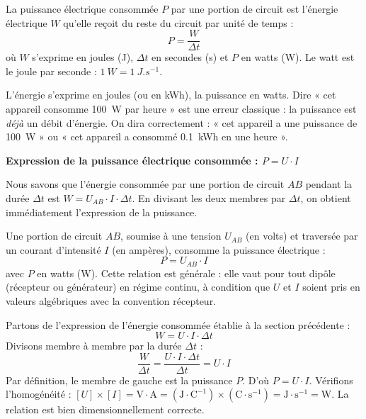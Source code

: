 \documentclass[11pt]{article}
\newcommand{\cle}[1]{{\popxbold\color{popdark}#1}}
\begin{document}
\begin{definition}
La \cle{puissance électrique consommée} $P$ par une portion de circuit est l'énergie électrique $W$ qu'elle reçoit du reste du circuit par unité de temps :
\[ P = \frac{W}{\Delta t} \]
où $W$ s'exprime en joules (J), $\Delta t$ en secondes (s) et $P$ en \cle{watts} (W). Le watt est le joule par seconde : $\SI{1}{W} = \SI{1}{J.s^{-1}}$.
\end{definition}

\begin{attention}
L'énergie s'exprime en joules (ou en kWh), la puissance en watts. Dire « cet appareil consomme \SI{100}{W} par heure » est une erreur classique : la puissance est \emph{déjà} un débit d'énergie. On dira correctement : « cet appareil a une puissance de \SI{100}{W} » ou « cet appareil a consommé \SI{0,1}{kWh} en une heure ».
\end{attention}

\textbf{Expression de la puissance électrique consommée : $P = U \cdot I$}\par

Nous savons que l'énergie consommée par une portion de circuit $AB$ pendant la durée $\Delta t$ est $W = U_{AB} \cdot I \cdot \Delta t$. En divisant les deux membres par $\Delta t$, on obtient immédiatement l'expression de la puissance.

\begin{propriete}
Une portion de circuit $AB$, soumise à une tension $U_{AB}$ (en volts) et traversée par un courant d'intensité $I$ (en ampères), consomme la puissance électrique :
\[ P = U_{AB} \cdot I \]
avec $P$ en watts (W). Cette relation est générale : elle vaut pour tout dipôle (récepteur ou générateur) en régime continu, à condition que $U$ et $I$ soient pris en valeurs algébriques avec la convention récepteur.
\end{propriete}

\begin{experience}
Partons de l'expression de l'énergie consommée établie à la section précédente :
\[ W = U \cdot I \cdot \Delta t \]
Divisons membre à membre par la durée $\Delta t$ :
\[ \frac{W}{\Delta t} = \frac{U \cdot I \cdot \Delta t}{\Delta t} = U \cdot I \]
Par définition, le membre de gauche est la puissance $P$. D'où $\boxed{P = U \cdot I}$. Vérifions l'homogénéité : $[U] \times [I] = \mathrm{V \cdot A} = (\mathrm{J \cdot C^{-1}}) \times (\mathrm{C \cdot s^{-1}}) = \mathrm{J \cdot s^{-1}} = \mathrm{W}$. La relation est bien dimensionnellement correcte.
\end{experience}
\end{document}
